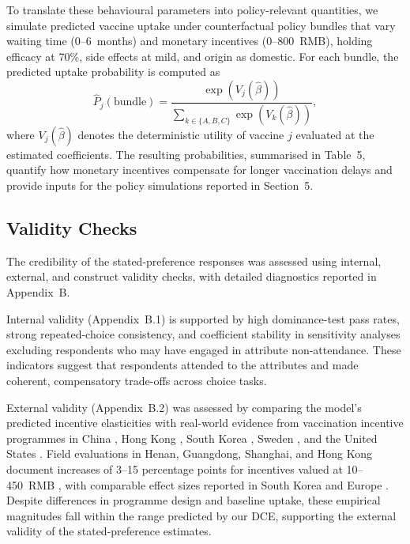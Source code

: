 \documentclass[12pt]{article}
\begin{document}
To translate these behavioural parameters into policy-relevant quantities, we simulate
predicted vaccine uptake under counterfactual policy bundles that vary waiting time
(0--6~months) and monetary incentives (0--800~RMB), holding efficacy at 70\%, side effects
at mild, and origin as domestic. For each bundle, the predicted uptake probability is
computed as
\[
\hat{P}_j(\text{bundle}) = 
\frac{\exp(V_j(\hat{\beta}))}
     {\sum_{k \in \{A,B,C\}} \exp(V_k(\hat{\beta}))},
\]
where $V_j(\hat{\beta})$ denotes the deterministic utility of vaccine $j$ evaluated at the
estimated coefficients. The resulting probabilities, summarised in Table~5, quantify how
monetary incentives compensate for longer vaccination delays and provide inputs for the
policy simulations reported in Section~5.

\subsection{Validity Checks}

The credibility of the stated-preference responses was assessed using internal, external,
and construct validity checks, with detailed diagnostics reported in Appendix~B.

Internal validity (Appendix~B.1) is supported by high dominance-test pass rates, strong
repeated-choice consistency, and coefficient stability in sensitivity analyses excluding
respondents who may have engaged in attribute non-attendance. These indicators suggest that
respondents attended to the attributes and made coherent, compensatory trade-offs across
choice tasks.

External validity (Appendix~B.2) was assessed by comparing the model’s predicted incentive
elasticities with real-world evidence from vaccination incentive programmes in China
\parencite{Hu2022,Li2023VaccIncentives}, Hong Kong \parencite{Yip2022HKincentives}, South
Korea \parencite{Kim2022SKincentive}, Sweden \parencite{CamposMercade2021}, and the United
States \parencite{Dave2021USincentives}. Field evaluations in Henan, Guangdong, Shanghai,
and Hong Kong document increases of 3--15 percentage points for incentives valued at
10--450~RMB \parencite{Hu2022,Li2023VaccIncentives,Yip2022HKincentives}, with comparable
effect sizes reported in South Korea and Europe \parencite{Kim2022SKincentive,
CamposMercade2021}. Despite differences in programme design and baseline uptake, these
empirical magnitudes fall within the range predicted by our DCE, supporting the external
validity of the stated-preference estimates.
\end{document}
